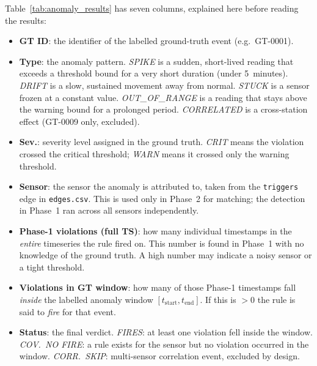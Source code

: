 ﻿\documentclass[11pt]{article}
\begin{document}
Table~\ref{tab:anomaly_results} has seven columns, explained here before reading the results:
\begin{itemize}
  \item \textbf{GT ID}: the identifier of the labelled ground-truth event
        (e.g.\ GT-0001).

  \item \textbf{Type}: the anomaly pattern.
        \emph{SPIKE} is a sudden, short-lived reading that exceeds a threshold bound for a very short duration (under 5~minutes).
        \emph{DRIFT} is a slow, sustained movement away from normal.
        \emph{STUCK} is a sensor frozen at a constant value.
        \emph{OUT\_OF\_RANGE} is a reading that stays above the warning bound
        for a prolonged period.
        \emph{CORRELATED} is a cross-station effect (GT-0009 only, excluded).

  \item \textbf{Sev.}: severity level assigned in the ground truth.
        \emph{CRIT} means the violation crossed the critical threshold;
        \emph{WARN} means it crossed only the warning threshold.

  \item \textbf{Sensor}: the sensor the anomaly is attributed to, taken
        from the \texttt{triggers} edge in \texttt{edges.csv}.
        This is used only in Phase~2 for matching; the detection in Phase~1
        ran across all sensors independently.

  \item \textbf{Phase-1 violations (full TS)}: how many individual
        timestamps in the \emph{entire} timeseries the rule fired on.
        This number is found in Phase~1 with no knowledge of the ground truth.
        A high number may indicate a noisy sensor or a tight threshold.

  \item \textbf{Violations in GT window}: how many of those Phase-1
        timestamps fall \emph{inside} the labelled anomaly window
        $[t_\text{start}, t_\text{end}]$.
        If this is $>0$ the rule is said to \emph{fire} for that event.

  \item \textbf{Status}: the final verdict.
        \emph{FIRES}: at least one violation fell inside the window.
        \emph{COV.\ NO FIRE}: a rule exists for the sensor but no violation
        occurred in the window.
        \emph{CORR.\ SKIP}: multi-sensor correlation event, excluded by design.
\end{itemize}
\end{document}
